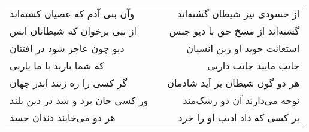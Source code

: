 \begin{center}
\begin{longtable}{l p{0.5cm} r}
وآن بنی آدم که عصیان کشته‌اند
&&
از حسودی نیز شیطان گشته‌اند
\\
از نبی برخوان که شیطانان انس
&&
گشته‌اند از مسخ حق با دیو جنس
\\
دیو چون عاجز شود در افتتان
&&
استعانت جوید او زین انسیان
\\
که شما یارید با ما یاریی
&&
جانب مایید جانب داریی
\\
گر کسی را ره زنند اندر جهان
&&
هر دو گون شیطان بر آید شادمان
\\
ور کسی جان برد و شد در دین بلند
&&
نوحه می‌دارند آن دو رشک‌مند
\\
هر دو می‌خایند دندان حسد
&&
بر کسی که داد ادیب او را خرد
\\
\end{longtable}
\end{center}
